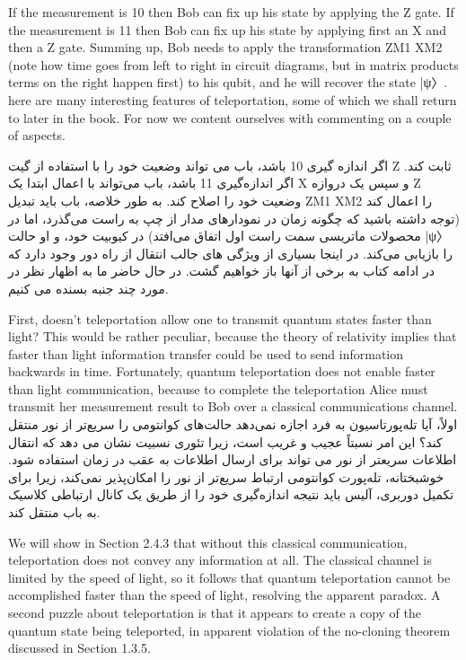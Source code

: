 \documentclass{book}
\begin{document}
If the measurement is 10 then Bob can fix up his state by applying the Z gate. If the measurement is 11 then Bob can fix up his state by applying first an X and then a Z gate. Summing up, Bob needs to apply the transformation ZM1 XM2 (note how time goes from left to right in circuit diagrams, but in matrix products terms on the right happen first) to his qubit, and he will recover the state |ψ〉. here are many interesting features of teleportation, some of which we shall return to later in the book. For now we content ourselves with commenting on a couple of aspects. 

اگر اندازه گیری 10 باشد، باب می تواند وضعیت خود را با استفاده از گیت Z ثابت کند. اگر اندازه‌گیری 11 باشد، باب می‌تواند با اعمال ابتدا یک X و سپس یک دروازه Z وضعیت خود را اصلاح کند. به طور خلاصه، باب باید تبدیل ZM1 XM2 را اعمال کند (توجه داشته باشید که چگونه زمان در نمودارهای مدار از چپ به راست می‌گذرد، اما در محصولات ماتریسی سمت راست اول اتفاق می‌افتد) در کیوبیت خود، و او حالت |ψ〉 را بازیابی می‌کند. در اینجا بسیاری از ویژگی های جالب انتقال از راه دور وجود دارد که در ادامه کتاب به برخی از آنها باز خواهیم گشت. در حال حاضر ما به اظهار نظر در مورد چند جنبه بسنده می کنیم.




First, doesn’t teleportation allow one to transmit quantum states faster than light? This would be rather peculiar, because the theory of relativity implies that faster than light information transfer could be used to send information backwards in time. Fortunately, quantum teleportation does not enable faster than light communication, because to complete the teleportation Alice must transmit her measurement result to Bob over a classical communications channel. 
اولاً، آیا تله‌پورتاسیون به فرد اجازه نمی‌دهد حالت‌های کوانتومی را سریع‌تر از نور منتقل کند؟ این امر نسبتاً عجیب و غریب است، زیرا تئوری نسبیت نشان می دهد که انتقال اطلاعات سریعتر از نور می تواند برای ارسال اطلاعات به عقب در زمان استفاده شود. خوشبختانه، تله‌پورت کوانتومی ارتباط سریع‌تر از نور را امکان‌پذیر نمی‌کند، زیرا برای تکمیل دوربری، آلیس باید نتیجه اندازه‌گیری خود را از طریق یک کانال ارتباطی کلاسیک به باب منتقل کند.




We will show in Section 2.4.3 that without this classical communication, teleportation does not convey any information at all. The classical channel is limited by the speed of light, so it follows that quantum teleportation cannot be accomplished faster than the speed of light, resolving the apparent paradox. A second puzzle about teleportation is that it appears to create a copy of the quantum state being teleported, in apparent violation of the no-cloning theorem discussed in Section 1.3.5.
\end{document}
